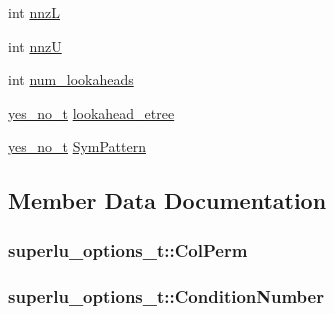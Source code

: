 \begin{DoxyCompactItemize}
int \hyperlink{structsuperlu__options__t_a2895f3e0cc73b730ae1b2dc14e306bfb}{nnz\+L}
\item 
int \hyperlink{structsuperlu__options__t_a4f1e7c0f5c61713355438db096175d33}{nnz\+U}
\item 
int \hyperlink{structsuperlu__options__t_aff4e1b4ecbbbd1e699fdd129df05534b}{num\+\_\+lookaheads}
\item 
\hyperlink{superlu__enum__consts_8h_ae6553118ce91b9c08f9376941ae1536f}{yes\+\_\+no\+\_\+t} \hyperlink{structsuperlu__options__t_afc61bd084a107fbb1de50ca617c3f59c}{lookahead\+\_\+etree}
\item 
\hyperlink{superlu__enum__consts_8h_ae6553118ce91b9c08f9376941ae1536f}{yes\+\_\+no\+\_\+t} \hyperlink{structsuperlu__options__t_adc6cd684f5db9572895041e8ccf343b0}{Sym\+Pattern}
\end{DoxyCompactItemize}


\subsection{Member Data Documentation}
\hypertarget{structsuperlu__options__t_af6e41a7d8ca989c5396f6edc67be0409}{}
\subsubsection[{Col\+Perm}]{ superlu\+\_\+options\+\_\+t\+::\+Col\+Perm}\label{structsuperlu__options__t_af6e41a7d8ca989c5396f6edc67be0409}
\hypertarget{structsuperlu__options__t_a3394d6658ec588071a9fee24a728eb07}{}
\subsubsection[{Condition\+Number}]{ superlu\+\_\+options\+\_\+t\+::\+Condition\+Number}\label{structsuperlu__options__t_a3394d6658ec588071a9fee24a728eb07}
\hypertarget{structsuperlu__options__t_ae574f08a3f4094dae8f635690b71d944}{}
